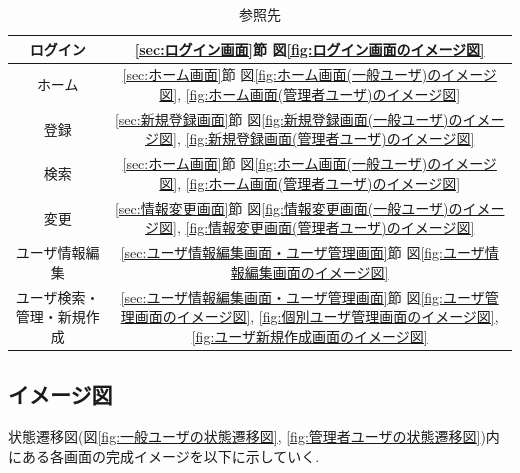\documentclass[11ptm]{jsarticle}
\begin{document}
\begin{table}[h]
  \caption*{参照先}
  \centering
  \begin{tabular}{c|c}
    ログイン                   & \ref{sec:ログイン画面}節 図\ref{fig:ログイン画面のイメージ図}                                                                                                             \\
    \hline
    ホーム                     & \ref{sec:ホーム画面}節 図\ref{fig:ホーム画面(一般ユーザ)のイメージ図}, \ref{fig:ホーム画面(管理者ユーザ)のイメージ図}                                                     \\
    \hline
    登録                       & \ref{sec:新規登録画面}節 図\ref{fig:新規登録画面(一般ユーザ)のイメージ図}, \ref{fig:新規登録画面(管理者ユーザ)のイメージ図}                                               \\
    \hline
    検索                       & \ref{sec:ホーム画面}節 図\ref{fig:ホーム画面(一般ユーザ)のイメージ図}, \ref{fig:ホーム画面(管理者ユーザ)のイメージ図}                                                     \\
    \hline
    変更                       & \ref{sec:情報変更画面}節 図\ref{fig:情報変更画面(一般ユーザ)のイメージ図}, \ref{fig:情報変更画面(管理者ユーザ)のイメージ図}                                               \\
    \hline
    ユーザ情報編集             & \ref{sec:ユーザ情報編集画面・ユーザ管理画面}節 図\ref{fig:ユーザ情報編集画面のイメージ図}                                                                                 \\
    \hline
    ユーザ検索・管理・新規作成 & \ref{sec:ユーザ情報編集画面・ユーザ管理画面}節 図\ref{fig:ユーザ管理画面のイメージ図}, \ref{fig:個別ユーザ管理画面のイメージ図}, \ref{fig:ユーザ新規作成画面のイメージ図}
  \end{tabular}
\end{table}



\clearpage
\subsection{イメージ図}
\label{sec:イメージ図}
状態遷移図(図\ref{fig:一般ユーザの状態遷移図}, \ref{fig:管理者ユーザの状態遷移図})内にある各画面の完成イメージを以下に示していく.

\end{document}
